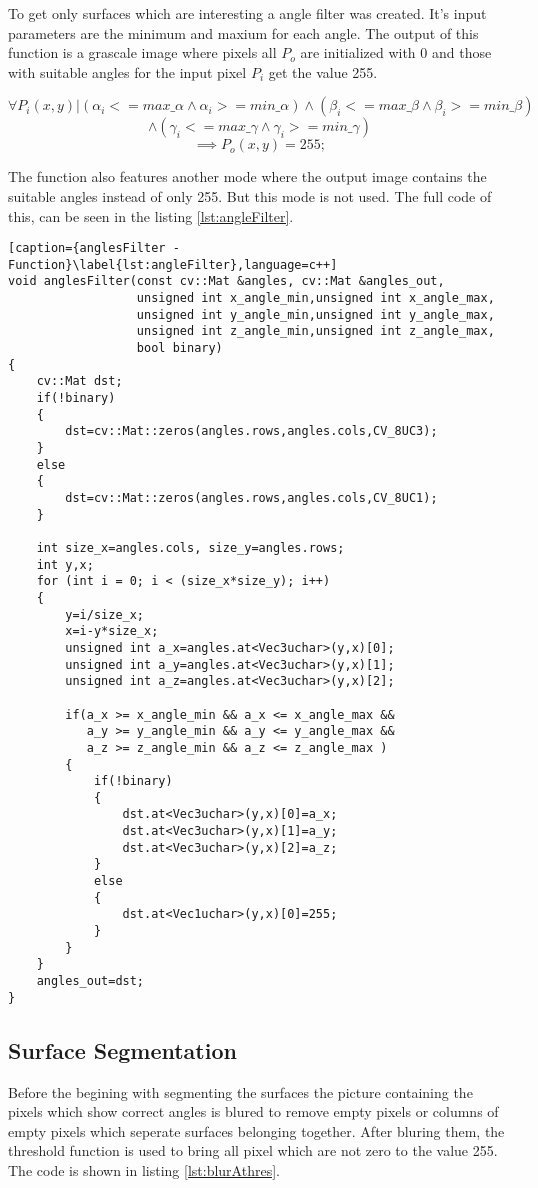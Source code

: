 To get only surfaces which are interesting a angle filter was created. It's input parameters
are the minimum and maxium for each angle. The output of this function is a grascale image
where pixels all $P_o$ are initialized with 0 and those with suitable angles 
for the input pixel $P_i$ get the value 255.

 \[
 	\forall P_i(x,y) | (\alpha_i<=max\_\alpha \wedge \alpha_i>=min\_\alpha) \wedge
 	(\beta_i<=max\_\beta \wedge \beta_i>=min\_\beta) \]\[ \wedge (\gamma_i<=max\_\gamma \wedge \gamma_i>=min\_\gamma)
 \]\[
 	\implies P_o(x,y) = 255;
 \] 

The function also features another mode where the output image contains the suitable angles instead of only 255.
But this mode is not used. The full code of this, can be seen in the listing \vref{lst:angleFilter}.

\begin{lstlisting}[caption={anglesFilter - Function}\label{lst:angleFilter},language=c++]
void anglesFilter(const cv::Mat &angles, cv::Mat &angles_out, 
                  unsigned int x_angle_min,unsigned int x_angle_max,
                  unsigned int y_angle_min,unsigned int y_angle_max,
                  unsigned int z_angle_min,unsigned int z_angle_max, 
                  bool binary)
{
	cv::Mat dst;
	if(!binary)
	{
		dst=cv::Mat::zeros(angles.rows,angles.cols,CV_8UC3);
	}
	else
	{
		dst=cv::Mat::zeros(angles.rows,angles.cols,CV_8UC1);
	}

	int size_x=angles.cols, size_y=angles.rows;
	int y,x;
	for (int i = 0; i < (size_x*size_y); i++)
	{
		y=i/size_x;
		x=i-y*size_x;
		unsigned int a_x=angles.at<Vec3uchar>(y,x)[0];
		unsigned int a_y=angles.at<Vec3uchar>(y,x)[1];
		unsigned int a_z=angles.at<Vec3uchar>(y,x)[2];

		if(a_x >= x_angle_min && a_x <= x_angle_max && 
	 	   a_y >= y_angle_min && a_y <= y_angle_max && 
	 	   a_z >= z_angle_min && a_z <= z_angle_max )
		{
			if(!binary)
			{
				dst.at<Vec3uchar>(y,x)[0]=a_x;
				dst.at<Vec3uchar>(y,x)[1]=a_y;
				dst.at<Vec3uchar>(y,x)[2]=a_z;
			}
			else
			{
				dst.at<Vec1uchar>(y,x)[0]=255;
			}
		}
	}
	angles_out=dst;
}
\end{lstlisting}



\subsection{Surface Segmentation}

Before the begining with segmenting the surfaces the picture containing the pixels which show correct angles
is blured to remove empty pixels or columns of empty pixels which seperate surfaces belonging together. After
bluring them, the threshold function is used to bring all pixel which are not zero to the value 255. The code is
shown in listing \vref{lst:blurAthres}.

